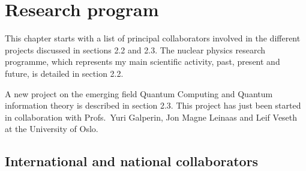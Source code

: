 \chapter{Research program}

This chapter starts with a list of principal collaborators
involved in the different projects discussed in sections 2.2
and 2.3. The nuclear physics research programme, which represents
my main scientific activity, past, present and future, 
is detailed in section 2.2.

A new project on the emerging field Quantum Computing and
Quantum information theory is described in section 2.3.
This project has just been started in collaboration
with Profs.~Yuri Galperin, Jon Magne Leinaas and Leif Veseth
at the University of Oslo.  

\section{International and national collaborators}


